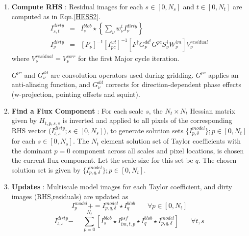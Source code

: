 \documentclass[structabstract]{aa}
\newcommand{\F}{{F}}
\newcommand{\Fd}{{F^\dag}}
\newcommand{\G}{{G}}
\newcommand{\Gddnu}{{G_{\nu}^{dd}}}
\newcommand{\Snd}{{S_{\nu}^\dag}}
\newcommand{\Wimn}{{W^{im}_{\nu}}}
\newcommand{\wnt}{{w_{\nu}^t}}
\newcommand{\Pnu}{{P_{\nu}}}
\begin{document}
\begin{enumerate}
\item\label{stepRHS} {\bf Compute RHS} : Residual images for each 
$s\in[0,N_s]$ and $t\in[0,N_t]$ are computed as in Eqn.\ref{HESS2}.
\begin{eqnarray}
I^{dirty}_{s,t} &=& I^{blob}_s \star \left\{ \sum_{\nu} \wnt I^{dirty}_{\nu} \right\} \\
I^{dirty}_{\nu} &=& [\Pnu]^{-1} [I^{wt}_{pc}]^{-1} [ \Fd \G_{\nu}^{{dd}^{\dag}} \G^{pc} \Snd \Wimn ]  V^{residual}_{\nu}
\end{eqnarray}
where $V^{residual}_{\nu} = V^{corr}_{\nu}$ for the first Major cycle iteration.


$\G^{pc}$ and $\Gddnu$ are convolution operators used during gridding.
$\G^{pc}$ applies an anti-aliasing function, and $\Gddnu$ corrects for direction-dependent
phase effects (w-projection, pointing offsets and squint).



\item\label{stepFind} {\bf Find a Flux Component} :
For each scale $s$, the $N_t\times N_t$ Hessian matrix given by $H_{t,p,s,s}$
is inverted and applied to all pixels of the corresponding RHS vector 
($I^{dirty}_{t,s};s\in[0,N_s]$), to generate
solution sets $\{I^{model}_{p,\delta}\};p\in[0,N_t]$ for each $s\in[0,N_s]$. 
The $N_t$ element solution set of Taylor coefficients
with the dominant $p=0$ component across all scales and pixel locations,
is chosen the current flux component. 
Let the scale size for this set be $q$. 
The chosen solution set is given by $\{I^{model}_{p,q,\delta}\};p\in[0,N_t]$.

\item\label{stepUpdate} {\bf Updates }: 
Multiscale model images for each Taylor coefficient, and dirty images (RHS,residuals) are updated as 
\begin{equation}
I^{model}_p += I^{model}_{p,q,\delta} \star I^{blob}_q ~~~~~~~~ \forall p\in[0,N_t]
\end{equation}
\begin{equation}
I^{dirty}_{t,s} -= \sum_{p=0}^{N_t} \left[ I^{blob}_{s} \star I^{psf}_{im,t,p} \star I^{blob}_{q} \star I^{model}_{p,q,\delta} \right] ~~~~~~~~ \forall t,s
\end{equation}


\end{enumerate}
\end{document}
